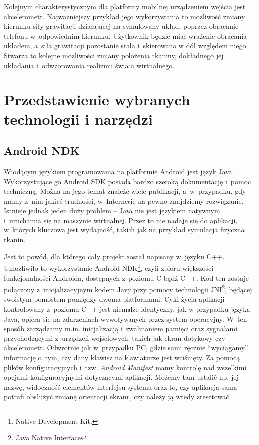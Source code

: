 		Kolejnym charakterystycznym dla platformy mobilnej urządzeniem wejścia jest akcelerometr. Najważniejszy przykład jego wykorzystania to możliwość zmiany kierunku siły grawitacji działającej na symulowany układ, poprzez obracanie telefonu w~odpowiednim kierunku. Użytkownik będzie miał wrażenie obracania układem, a~siła grawitacji pozostanie stała i~skierowana w dół względem niego. Stwarza to kolejne możliwości zmiany położenia tkaniny, dokładnego jej układania i~odwzorowania realizmu świata wirtualnego.

	
	\section{Przedstawienie wybranych technologii i narzędzi}
	\label{t:technologie:narzedzia}
	
		\subsection{Android NDK}
		\label{t:technologie:narzedzia:ndk}
		
		
		Wiodącym językiem programowania na platformie Android jest język Java. Wykorzystujące go Android SDK posiada bardzo szeroką dokumentację i~pomoc techniczną. Można na jego temat znaleźć wiele publikacji, a~w~przypadku, gdy mamy z~nim jakieś trudności, w~Internecie na pewno znajdziemy rozwiązanie. Istnieje jednak jeden duży problem -- Java nie jest językiem natywnym i~uruchamia się na maszynie wirtualnej. Przez to nie nadaje się do aplikacji, w~których kluczowa jest wydajność, takich jak na przykład symulacja fizyczna tkanin.
		
		Jest to powód, dla którego cały projekt został napisany w~języku C++. Umożliwiło to wykorzystanie Android NDK\footnote{Native Development Kit.}, czyli zbioru większości funkcjonalności Androida, dostępnych z~poziomu C bądź C++. Kod ten zostaje połączony z~inicjalizacyjnym kodem Javy przy pomocy technologii JNI\footnote{Java Native Interface}, będącej swoistym pomostem pomiędzy dwoma platformami. Cykl życia aplikacji kontrolowany z~poziomu C++ jest niemalże identyczny, jak w przypadku języka Java, opiera się na zdarzeniach wywoływanych przez system operacyjny. W~ten sposób zarządzamy m.in. inicjalizacją i~zwalnianiem pamięci oraz sygnałami przychodzącymi z~urządzeń wejściowych, takich jak ekran dotykowy czy akcelerometr. Odwrotnie jak w~przypadku PC, gdzie sami ręcznie ``wyciągamy'' informację o~tym, czy dany klawisz na klawiaturze jest wciśnięty. Za pomocą plików konfiguracyjnych i~tzw. \emph{Android Manifest} mamy kontrolę nad wszelkimi opcjami konfiguracyjnymi dotyczącymi aplikacji. Możemy tam ustalić np. jej nazwę, widoczność elementów interfejsu systemu oraz to, czy aplikacja sama potrafi obsłużyć zmianę orientacji ekranu, czy należy ją wtedy zresetować.
		
